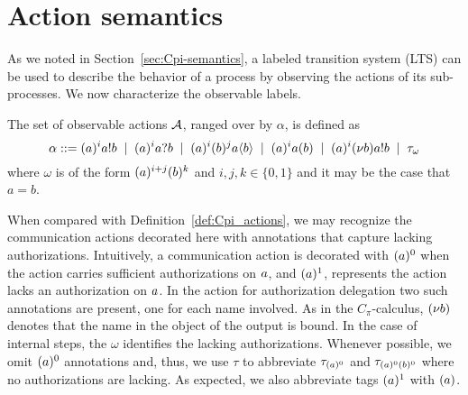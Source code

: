 \section{Action semantics}\label{subsec:LTS}
As we noted in Section~\ref{sec:Cpi-semantics}, a labeled transition system (LTS) can be used to describe the behavior of a process by observing the actions of its sub-processes. 
We now characterize the observable labels.

\begin{definition}[Actions] The set of observable actions ${\cal A}$, ranged over by $\alpha$, is defined as  
%
$$
\alpha ::= (a)^ia!b \; \;|\; \; (a)^ia?b \; \;|\; \; (a)^i(b)^ja\langle b\rangle \; \;|\; \; (a)^ia(b) \; \;|\; \;  (a)^i(\nu b)a!b \; \;|\; \; \tau_\omega
$$
%
where $\omega$ is of the form 
$(a)^{i+j}(b)^k$ and $i,j,k\in\{0,1\}$ and it may be the case that $a = b$. 
\end{definition}
When compared with Definition~\ref{def:Cpi_actions}, we may recognize the communication actions decorated here with %
annotations that capture lacking authorizations. Intuitively, a communication action is decorated with 
$(a)^0$ when the action 
 carries
sufficient authorizations on $a$,
and $(a)^1$, represents the action %
lacks an authorization on $a$.  
In the action for authorization delegation two such annotations are present, one for each name involved. 
As in the $C_\pi$-calculus, $(\nu b)$
denotes that the name in the object of the 
output is bound. %
In the case of internal steps, the $\omega$ %
identifies the  lacking authorizations. 
Whenever possible, we omit $(a)^0$ annotations 
and, thus, we use $\tau$ to abbreviate $\tau_{(a)^{0}}$ and $\tau_{(a)^{0}(b)^0}$ where no authorizations are lacking. As expected, we also abbreviate tags $(a)^1$ with $(a)$.
%

